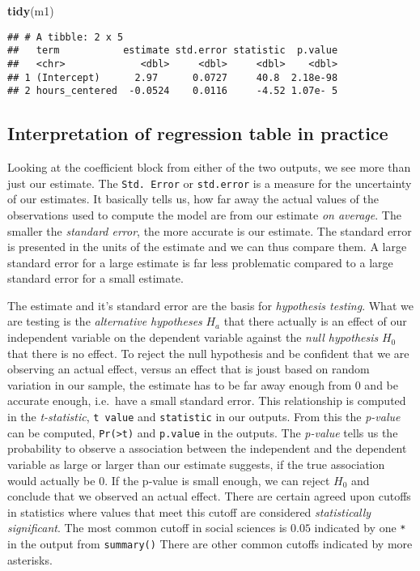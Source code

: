 \documentclass[
]{book}
\newenvironment{Shaded}{\begin{snugshade}}{\end{snugshade}}
\newcommand{\FunctionTok}[1]{\textcolor[rgb]{0.13,0.29,0.53}{\textbf{#1}}}
\newcommand{\NormalTok}[1]{#1}
\begin{document}
\begin{Shaded}
\begin{Highlighting}[]
\FunctionTok{tidy}\NormalTok{(m1)}
\end{Highlighting}
\end{Shaded}

\begin{verbatim}
## # A tibble: 2 x 5
##   term           estimate std.error statistic  p.value
##   <chr>             <dbl>     <dbl>     <dbl>    <dbl>
## 1 (Intercept)      2.97      0.0727     40.8  2.18e-98
## 2 hours_centered  -0.0524    0.0116     -4.52 1.07e- 5
\end{verbatim}

\hypertarget{interpretation-of-regression-table-in-practice}{%
\subsection{Interpretation of regression table in practice}\label{interpretation-of-regression-table-in-practice}}

Looking at the coefficient block from either of the two outputs, we see more
than just our estimate. The \texttt{Std.\ Error} or \texttt{std.error} is a measure for the
uncertainty of our estimates. It basically tells us, how far away the actual
values of the observations used to compute the model are from our estimate
\emph{on average}. The smaller the \emph{standard error}, the more accurate is our
estimate. The standard error is presented in the units of the estimate and we
can thus compare them. A large standard error for a large estimate is far less
problematic compared to a large standard error for a small estimate.

The estimate and it's standard error are the basis for \emph{hypothesis testing}.
What we are testing is the \emph{alternative hypotheses} \(H_a\) that there actually
is an effect of our independent variable on the dependent variable against the
\emph{null hypothesis} \(H_0\) that there is no effect. To reject the null hypothesis
and be confident that we are observing an actual effect, versus an effect that
is joust based on random variation in our sample, the estimate has to be far
away enough from \(0\) and be accurate enough, i.e.~have a small standard error.
This relationship is computed in the \emph{t-statistic}, \texttt{t\ value} and \texttt{statistic} in
our outputs. From this the \emph{p-value} can be computed, \texttt{Pr(\textgreater{}\textbar{}t\textbar{})} and \texttt{p.value}
in the outputs. The \emph{p-value} tells us the probability to observe a association
between the independent and the dependent variable as large or larger than our
estimate suggests, if the true association would actually be \(0\). If the p-value
is small enough, we can reject \(H_0\) and conclude that we observed an actual
effect. There are certain agreed upon cutoffs in statistics where values that
meet this cutoff are considered \emph{statistically significant}. The most common
cutoff in social sciences is \(0.05\) indicated by one \texttt{*} in the output from
\texttt{summary()} There are other common cutoffs indicated by more asterisks.
\end{document}
